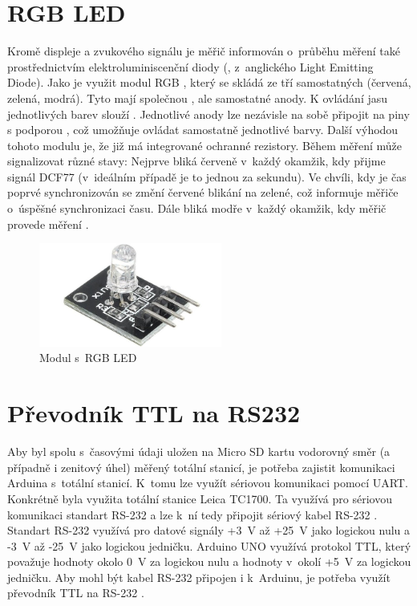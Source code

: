 \section{RGB LED}
Kromě displeje a zvukového signálu je měřič informován o~průběhu měření také prostřednictvím elektroluminiscenční diody (, z~anglického Light Emitting Diode). Jako  je využit modul RGB , který se skládá ze tří samostatných  (červená, zelená, modrá). Tyto  mají společnou , ale samostatné anody. K ovládání jasu jednotlivých barev slouží . Jednotlivé anody lze nezávisle na sobě připojit na piny s podporou , což umožňuje ovládat samostatně jednotlivé barvy. Další výhodou tohoto modulu je, že již má integrované ochranné rezistory. Během měření může  signalizovat různé stavy: Nejprve bliká červeně v~každý okamžik, kdy přijme signál DCF77 (v~ideálním případě je to jednou za sekundu). Ve chvíli, kdy je čas poprvé synchronizován se změní červené blikání na zelené, což informuje měřiče o~úspěšné synchronizaci času. Dále  bliká modře v~každý okamžik, kdy měřič provede měření \cite{arduino_navody}.
\begin{figure}[H]
	\centering
	\includegraphics[width=6cm]{images/komponenty/RGB_LED.jpg}
	\caption{Modul s~RGB LED \cite{dratek_web}}
\end{figure}

\section{Převodník TTL na RS232}
Aby byl spolu s~časovými údaji uložen na Micro SD kartu vodorovný směr (a případně i zenitový úhel) měřený totální stanicí, je potřeba zajistit komunikaci Arduina s~totální stanicí. K~tomu lze využít sériovou komunikaci pomocí UART. Konkrétně byla využita totální stanice Leica TC1700. Ta využívá pro sériovou komunikaci standart RS-232 a lze k~ní tedy připojit sériový kabel RS-232 \cite{tps-dna}. Standart RS-232 využívá pro datové signály +3~V až +25~V jako logickou nulu a -3~V až -25~V jako logickou jedničku. Arduino UNO využívá protokol TTL, který považuje hodnoty okolo 0~V za logickou nulu a hodnoty v~okolí +5~V za logickou jedničku. Aby mohl být kabel RS-232 připojen i k~Arduinu, je potřeba využít převodník TTL na RS-232 \cite{sparkfun-tutorial}.

